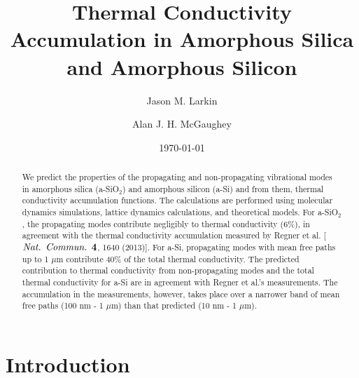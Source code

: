 \documentclass[aps,prb,twocolumn,superscriptaddress,footinbib,amsmath,amssymb,floatfix]{revtex4}
\begin{document}
\title{Thermal Conductivity 
Accumulation in Amorphous Silica and Amorphous Silicon}
\author{Jason M. Larkin}
\author{Alan J. H. McGaughey}

\date{\today}
\begin{abstract}
We predict the properties of the propagating and non-propagating 
vibrational modes in amorphous silica (a-SiO$_2$) and amorphous silicon 
(a-Si) and from them, thermal conductivity accumulation functions. 
The calculations are performed using molecular dynamics simulations, 
lattice dynamics calculations, and theoretical models. For a-SiO$_2$, 
the propagating modes contribute negligibly to thermal conductivity 
(6$\%$), in 
agreement with the thermal conductivity accumulation measured by 
Regner et al. [$\emph{Nat. Commun.}$ $\bf{4}$, 1640 (2013)]. 
For a-Si, propagating modes 
with mean free paths up to 1 $\mu$m contribute 40$\%$ of the total 
thermal 
conductivity. The predicted contribution to thermal conductivity from 
non-propagating modes and the total thermal conductivity for a-Si are in 
agreement with Regner et al.'s measurements. The accumulation in the 
measurements, however, takes place over a narrower band of 
mean free paths (100 nm - 1 $\mu$m) than that predicted 
(10 nm - 1 $\mu$m).
\end{abstract}
\maketitle
\section{\label{S:Introduction}Introduction}
\end{document}
